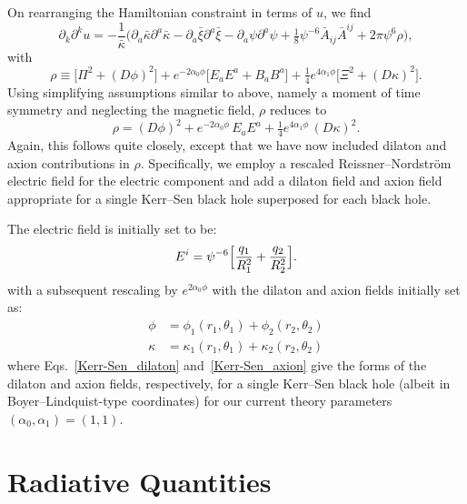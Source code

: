 On rearranging the Hamiltonian constraint in terms of $u$, we find
\begin{equation}
    \partial_k\partial^k u = -\frac{1}{\bar{\kappa}} \Big(
    \partial_a \bar{\kappa} \partial^a \bar{\kappa} 
    - \partial_a \bar{\xi} \partial^a \bar{\xi} 
    - \partial_a \psi \partial^a \psi
    + \tfrac{1}{8} \psi^{-6} \bar{A}_{ij} \bar{A}^{ij}
    + 2 \pi \psi^{6} \rho
    \Big),
\end{equation}
with
\begin{equation}
    \rho \equiv \bigl[ \Pi^2 + (D\phi)^2 \bigr]
    + e^{-2 \alpha_0 \phi}\big[ E_a E^a +  B_a  B^a\big] 
    + \tfrac{1}{4} e^{4 \alpha_1 \phi}\big[\Xi^2 + (D\kappa)^2\big].
\end{equation}
Using simplifying assumptions similar to above, namely a moment of time symmetry and neglecting the magnetic field, $\rho$ reduces to
\begin{equation}
    \rho = (D\phi)^2 + e^{-2 \alpha_0 \phi} \, E_a E^a + \tfrac{1}{4} e^{4\alpha_1 \phi} \, (D\kappa)^2 .
\end{equation}
Again, this follows \cite{Bozzola2019} quite closely, except that we have now included dilaton and axion contributions in $\rho$. Specifically, we employ a rescaled Reissner--Nordström electric field for the electric component and add a dilaton field and axion field appropriate for a single Kerr--Sen black hole superposed for each black hole.  

The electric field is initially set to be:
\begin{equation}
     E^i = \psi^{-6} \Bigl[ \frac{q_1}{R_1^2} + \frac{q_2}{R_2^2} \Bigr].
\end{equation}
with a subsequent rescaling by $e^{2 \alpha_0 \phi}$ with the dilaton and axion fields initially set as:
\begin{align}
\phi &= \phi_1(r_1,\theta_1) + \phi_2(r_2, \theta_2) \\
\kappa &= \kappa_1(r_1,\theta_1) + \kappa_2(r_2, \theta_2)
\end{align}
where Eqs.~\eqref{Kerr-Sen_dilaton} and~\eqref{Kerr-Sen_axion}
give the forms of the dilaton and axion fields, respectively, for a
single Kerr--Sen black hole (albeit in Boyer--Lindquist-type coordinates)
for our current theory parameters $(\alpha_0,\alpha_1)=(1,1)$.
\section{Radiative Quantities}

